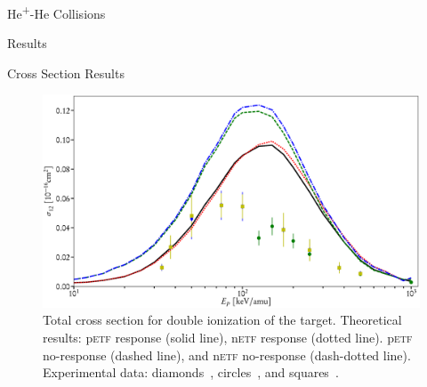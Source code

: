 \documentclass[a5paper, 9 pt]{extreport}
\begin{document}
\begin{chapter}{\texorpdfstring{He\textsuperscript{+}}{He+}-He Collisions \label{chap:hephe}}
\begin{section}{Results \label{sec:hephe-disc}}
\begin{subsection}{Cross Section Results \label{sec:hephe-res}}
         \begin{figure}[t]
            \centering
            \includegraphics[width = \linewidth]{./images/hephe-cross/HepHe-012.eps}
            \caption[Total cross section for double ionization of the target in He\textsuperscript{+}-He
                     collisions.]
                    {Total cross section for double ionization of the target.
                     Theoretical results: p\textsc{etf} response (solid line), n\textsc{etf} response
                                          (dotted line). p\textsc{etf} no-response (dashed line), and
                                          n\textsc{etf} no-response (dash-dotted line).
                     Experimental data: diamonds~\cite{Dub-89}, circles~\cite{FTFHLP-95}, and
                                        squares~\cite{DT-88}. \label{fig:cs012}}
         \end{figure}


\end{subsection}
\end{section}
\end{chapter}
\end{document}
